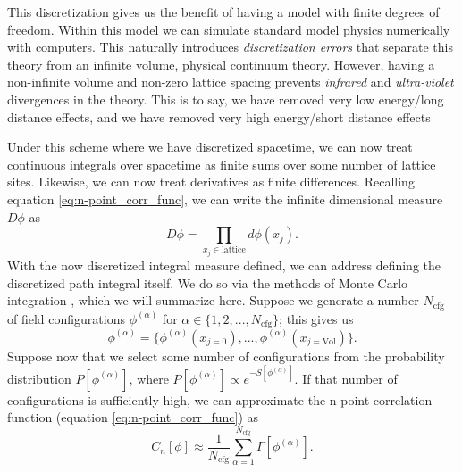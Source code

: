 This discretization gives us the benefit of having a model with finite degrees of freedom.  Within this model we can simulate standard model physics numerically with computers.  This naturally introduces \textit{discretization errors} that separate this theory from an infinite volume, physical continuum theory. However, having a non-infinite volume and non-zero lattice spacing prevents \textit{infrared} and \textit{ultra-violet} divergences in the theory.  This is to say, we have removed very low energy/long distance effects, and we have removed very high energy/short distance effects

Under this scheme where we have discretized spacetime, we can now treat continuous integrals over spacetime as finite sums over some number of lattice sites.  Likewise, we can now treat derivatives as finite differences.  Recalling equation \ref{eq:n-point_corr_func}, we can write the infinite dimensional measure $D\phi$ as
\begin{equation}
    D\phi = \prod_{x_j \in \mathrm{lattice}} d\phi(x_j).
\end{equation}
With the now discretized integral measure defined, we can address defining the discretized path integral itself.  We do so via the methods of Monte Carlo integration \cite{Metropolis:1953am, Hastings:1970aa, Creutz:1980zw, Duane:1987de}, which we will summarize here.  Suppose we generate a number $N_\mathrm{cfg}$ of field configurations $\phi^{(\alpha)}$ for $\alpha \in \{1,2,...,N_\mathrm{cfg}\}$; this gives us
\begin{equation}
    \phi^{(\alpha)} = \{ \phi^{(\alpha)}(x_{j=0}),...,\phi^{(\alpha)}(x_{j=\mathrm{Vol}}) \}.
\end{equation}
Suppose now that we select some number of configurations from the probability distribution $P[\phi^{(\alpha)}]$, where $P[\phi^{(\alpha)}] \propto e^{-S[\phi^{(\alpha)}]}$.  If that number of configurations is sufficiently high, we can approximate the n-point correlation function (equation \ref{eq:n-point_corr_func}) as
\begin{equation}\label{eq:approx_n-corr_func}
    C_n[\phi] \approx \frac{1}{N_\mathrm{cfg}} \sum_{\alpha=1}^{N_\mathrm{cfg}} \Gamma [\phi^{(\alpha)}].
\end{equation}
